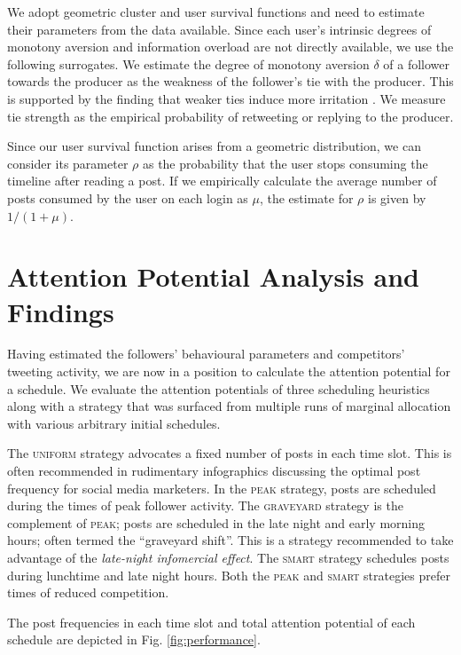 \documentclass[onecolumn, 12 pt, doublespace, fullpage, letterpaper]{report}
\begin{document}
We adopt geometric cluster and user survival functions and need to estimate their parameters from the data available. Since each user's intrinsic degrees of monotony aversion and information overload are not directly available, we use the following surrogates. We estimate the degree of monotony aversion $\delta$ of a follower towards the producer as the weakness of the follower's tie with the producer. This is supported by the finding that weaker ties induce more irritation \cite{koroleva2011cognition}. We measure tie strength as the empirical probability of retweeting or replying to the producer.

Since our user survival function arises from a geometric distribution, we can consider its parameter $\rho$ as the probability that the user stops consuming the timeline after reading a post. If we empirically calculate the average number of posts consumed by the user on each login as $\mu$, the estimate for $\rho$ is given by $1 / (1 + \mu)$.

\section{Attention Potential Analysis and Findings}

Having estimated the followers' behavioural parameters and competitors' tweeting activity, we are now in a position to calculate the attention potential for a schedule. We evaluate the attention potentials of three scheduling heuristics along with a strategy that was surfaced from multiple runs of marginal allocation with various arbitrary initial schedules.

The \textsc{uniform} strategy advocates a fixed number of posts in each time slot. This is often recommended in rudimentary infographics discussing the optimal post frequency for social media marketers. In the \textsc{peak} strategy, posts are scheduled during the times of peak follower activity. The \textsc{graveyard} strategy is the complement of \textsc{peak}; posts are scheduled in the late night and early morning hours; often termed the ``graveyard shift''. This is a strategy recommended to take advantage of the \textit{late-night infomercial effect}\footnotemark[5]. The \textsc{smart} strategy schedules posts during lunchtime and late night hours. Both the \textsc{peak} and \textsc{smart} strategies prefer times of reduced competition.

The post frequencies in each time slot and total attention potential of each schedule are depicted in Fig. \ref{fig:performance}.
\end{document}
